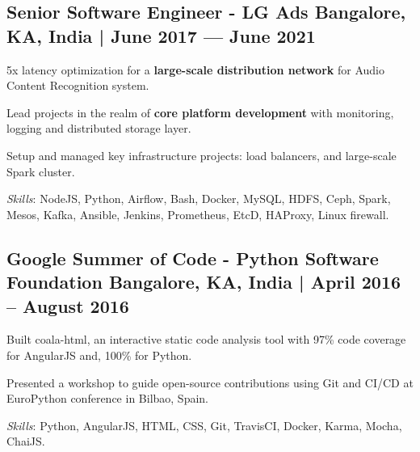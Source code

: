\subsection{{Senior Software Engineer - LG Ads \hfill Bangalore, KA, India | June 2017 --- June 2021}}
\begin{zitemize}
\item 5x latency optimization for a \textbf{large-scale distribution network} for Audio Content Recognition system.
\item Lead projects in the realm of \textbf{core platform development} with monitoring, logging and distributed storage layer. 
\item Setup and managed key infrastructure projects: load balancers, and large-scale Spark cluster.
\end{zitemize}

\textit{Skills}: NodeJS, Python, Airflow, Bash, Docker, MySQL, HDFS, Ceph, Spark, Mesos, Kafka, Ansible, Jenkins, Prometheus, EtcD, HAProxy, Linux firewall.
\vspace*{1mm}

\subsection{{Google Summer of Code - Python Software Foundation \hfill Bangalore, KA, India | April 2016 -- August 2016}}
\begin{zitemize}
\item Built coala-html, an interactive static code analysis tool with 97\% code coverage for AngularJS and, 100\% for Python.
\item Presented a workshop to guide open-source contributions using Git and CI/CD at EuroPython conference in Bilbao, Spain.
\end{zitemize}
\textit{Skills}: Python, AngularJS, HTML, CSS, Git, TravisCI, Docker, Karma, Mocha, ChaiJS.
